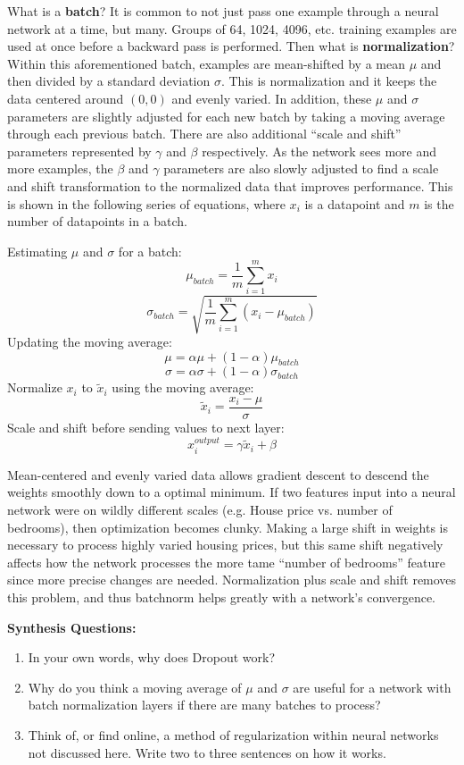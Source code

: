     What is a \textbf{batch}? It is common to not just pass one example through a neural network at a time, but many. Groups of 64, 1024, 4096, etc. training examples are used at once before a backward pass is performed. Then what is \textbf{normalization}? Within this aforementioned batch, examples are mean-shifted by a mean $\mu$ and then divided by a standard deviation $\sigma$. This is normalization and it keeps the data centered around $(0,0)$ and evenly varied. In addition, these $\mu$ and $\sigma$ parameters are slightly adjusted for each new batch by taking a moving average through each previous batch. There are also additional ``scale and shift'' parameters represented by $\gamma$ and $\beta$ respectively. As the network sees more and more examples, the $\beta$ and $\gamma$ parameters are also slowly adjusted to find a scale and shift transformation to the normalized data that improves performance. This is shown in the following series of equations, where $x_i$ is a datapoint and $m$ is the number of datapoints in a batch. 

    Estimating $\mu$ and $\sigma$ for a batch:
    $$\mu_{batch} = \frac{1}{m}\sum_{i=1}^m x_i$$
    $$\sigma_{batch} = \sqrt{\frac{1}{m}\sum_{i=1}^m (x_i - \mu_{batch})}$$
    Updating the moving average:
    $$\mu = \alpha \mu + (1-\alpha)\mu_{batch}$$
    $$\sigma = \alpha \sigma + (1-\alpha)\sigma_{batch}$$
    Normalize $x_i$ to $\tilde{x}_i$ using the moving average:
    $$\tilde{x}_i = \frac{x_i - \mu}{\sigma}$$
    Scale and shift before sending values to next layer:
    $$x_i^{output} = \gamma\tilde{x}_i + \beta$$
    
    Mean-centered and evenly varied data allows gradient descent to descend the weights smoothly down to a optimal minimum. If two features input into a neural network were on wildly different scales (e.g. House price vs. number of bedrooms), then optimization becomes clunky. Making a large shift in weights is necessary to process highly varied housing prices, but this same shift negatively affects how the network processes the more tame ``number of bedrooms'' feature since more precise changes are needed. Normalization plus scale and shift removes this problem, and thus batchnorm helps greatly with a network's convergence.

\begin{questionbox}
    \textbf{Synthesis Questions:}
    \begin{enumerate}
        \item In your own words, why does Dropout work?
        \item Why do you think a moving average of $\mu$ and $\sigma$ are useful for a network with batch normalization layers if there are many batches to process?
        \item Think of, or find online, a method of regularization within neural networks not discussed here. Write two to three sentences on how it works.
    \end{enumerate}
\end{questionbox}

